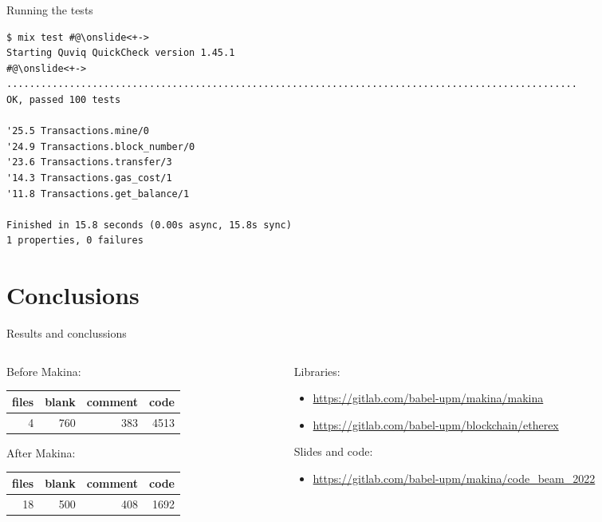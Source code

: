 \documentclass[aspectratio=169, 10pt]{beamer}
\begin{document}
\begin{frame}[label={sec:org7b45f5b},fragile]{Running the tests}
 \onslide<+->
\onslide<+->
\lstset{language=bash,label= ,caption= ,captionpos=b,numbers=none,style=shell}
\begin{lstlisting}
$ mix test #@\onslide<+->
Starting Quviq QuickCheck version 1.45.1
#@\onslide<+->
....................................................................................................
OK, passed 100 tests

'25.5 Transactions.mine/0
'24.9 Transactions.block_number/0
'23.6 Transactions.transfer/3
'14.3 Transactions.gas_cost/1
'11.8 Transactions.get_balance/1

Finished in 15.8 seconds (0.00s async, 15.8s sync)
1 properties, 0 failures
\end{lstlisting}
\end{frame}

\section{Conclusions}
\label{sec:orgc25f3da}
\begin{frame}[label={sec:orga14eb05}]{Results and conclussions}
\begin{columns}
\begin{column}{0.38\columnwidth}
Before Makina:
\begin{center}
\begin{tabular}{rrrr}
files & blank & comment & code\\
\hline
4 & 760 & 383 & 4513\\
\end{tabular}
\end{center}

\vspace{10pt}

After Makina:
\begin{center}
\begin{tabular}{rrrr}
files & blank & comment & code\\
\hline
18 & 500 & 408 & 1692\\
\end{tabular}
\end{center}
\end{column}

\begin{column}{0.58\columnwidth}
Libraries:
\begin{itemize}
\item \url{https://gitlab.com/babel-upm/makina/makina}
\item \url{https://gitlab.com/babel-upm/blockchain/etherex}
\end{itemize}

Slides and code:  
\begin{itemize}
\item \url{https://gitlab.com/babel-upm/makina/code\_beam\_2022}
\end{itemize}
\end{column}
\end{columns}
\end{frame}
\end{document}
